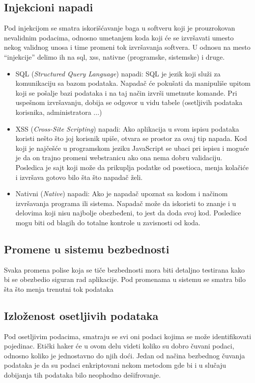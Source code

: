 \documentclass[a4paper]{article}
\begin{document}
{\subsection{Injekcioni napadi}
 Pod injekcijom se smatra iskorišćavanje baga u softveru koji je prouzrokovan nevalidnim podacima, odnosno umetanjem koda koji će se izvršavati umesto nekog validnog unosa i time promeni tok izvršavanja softvera. U odnosu na mesto “injekcije” delimo ih na sql, xss, nativne (programske, sistemske) i druge.
 \begin{itemize}
 \item SQL ({\em Structured Query Language}) napadi:  SQL je jezik koji služi za komunikaciju sa bazom podataka.
Napadač će pokušati da manipuliše upitom koji se pošalje bazi podataka i na taj način izvrši umetnute komande.
Pri uspešnom izvršavanju, dobija se odgovor u vidu tabele (osetljivih podataka korisnika, administratora ...)
\item XSS ({\em Cross-Site Scripting}) napadi:  Ako aplikacija u svom ispisu podataka koristi nešto što joj korisnik upiše, otvara se prostor za ovaj tip napada. Kod koji je najčešće u programskom jeziku JavaScript se ubaci pri ispisu i moguće je da on trajno promeni webstranicu ako ona nema dobru validaciju. Posledica je sajt koji može da prikuplja podatke od posetioca, menja kolačiće i izvršava gotovo bilo šta što napadač želi.
\item Nativni ({\em Native}) napadi:  Ako je napadač upoznat sa kodom i načinom izvršavanja programa ili sistema. Napadač može da iskoristi to znanje i u delovima koji nisu najbolje obezbeđeni, to jest da doda svoj kod. Posledice mogu biti od blagih do totalne kontrole u zavisnosti od koda.\cite{injectionattacks}
\end{itemize} 

\newpage
\subsection{Promene u sistemu bezbednosti}
 Svaka promena polise koja se tiče bezbednosti mora biti detaljno testirana kako bi se obezbedio siguran rad aplikacije. Pod promenama u sistemu se smatra bilo šta što menja trenutni tok podataka
 
\subsection{Izloženost osetljivih podataka}
Pod osetljivim podacima, smatraju se svi oni podaci kojima se može identifikovati pojedinac. Etički haker će u ovom delu videti koliko su dobro čuvani podaci, odnosno koliko je jednostavno do njih doći. Jedan od načina bezbednog čuvanja podataka je da su podaci enkriptovani nekom metodom gde bi i u slučaju dobijanja tih podataka bilo neophodno dešifrovanje. 

}
\end{document}
